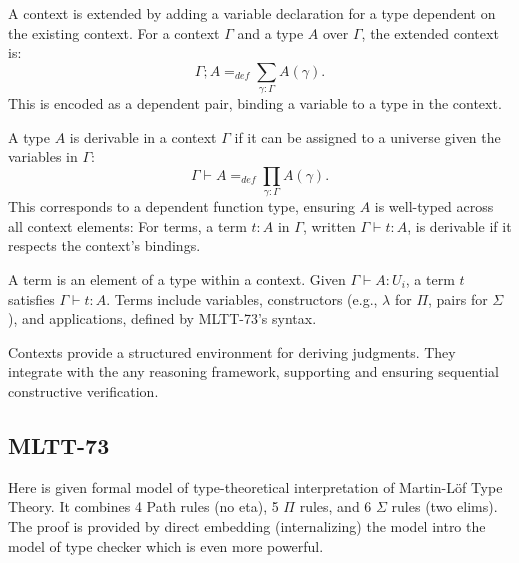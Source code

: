 \documentclass{article}
\begin{document}
\begin{definition}
A context is extended by adding a variable declaration for a
type dependent on the existing context. For a context \( \Gamma \)
and a type \( A \) over \( \Gamma \), the extended context is:
\[
\Gamma ; A =_{def} \sum_{\gamma:\Gamma}A(\gamma).
\]
This is encoded as a dependent pair,
binding a variable to a type in the context.
\end{definition}

\begin{definition}
A type \( A \) is derivable in a context \( \Gamma \) if it can be
assigned to a universe given the variables in \( \Gamma \):
\[
\Gamma \vdash A =_{def} \prod_{\gamma:\Gamma}A(\gamma).
\]
This corresponds to a dependent function type,
ensuring \( A \) is well-typed across all context elements:
For terms, a term \( t : A \) in \( \Gamma \), written \( \Gamma \vdash t : A \),
is derivable if it respects the context’s bindings.
\end{definition}

\begin{definition}[Terms]
A term is an element of a type within a context.
Given \( \Gamma \vdash A : U_i \), a term \( t \)
satisfies \( \Gamma \vdash t : A \). Terms include
variables, constructors (e.g., \( \lambda \) for \( \Pi \),
pairs for \( \Sigma \)), and applications, defined by MLTT-73’s
syntax.
\end{definition}

Contexts provide a structured environment for deriving judgments.
They integrate with the any reasoning framework, supporting and ensuring
sequential constructive verification.

\subsection*{MLTT-73}
Here is given formal model of type-theoretical interpretation of Martin-Löf Type Theory.
It combines 4 Path rules (no eta), 5 $\Pi$ rules, and 6 $\Sigma$ rules (two elims).
The proof is provided by direct embedding (internalizing) the model intro the model
of type checker which is even more powerful.
\end{document}
